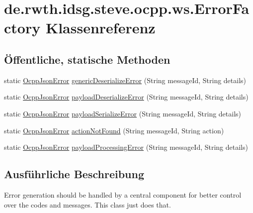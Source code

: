 \hypertarget{classde_1_1rwth_1_1idsg_1_1steve_1_1ocpp_1_1ws_1_1_error_factory}{\section{de.\-rwth.\-idsg.\-steve.\-ocpp.\-ws.\-Error\-Factory Klassenreferenz}
\label{classde_1_1rwth_1_1idsg_1_1steve_1_1ocpp_1_1ws_1_1_error_factory}
}
\subsection*{Öffentliche, statische Methoden}
\begin{DoxyCompactItemize}
\item 
static \hyperlink{classde_1_1rwth_1_1idsg_1_1steve_1_1ocpp_1_1ws_1_1data_1_1_ocpp_json_error}{Ocpp\-Json\-Error} \hyperlink{classde_1_1rwth_1_1idsg_1_1steve_1_1ocpp_1_1ws_1_1_error_factory_a2db20dbc0ac39ded7843ff0167402f43}{generic\-Deserialize\-Error} (String message\-Id, String details)
\item 
static \hyperlink{classde_1_1rwth_1_1idsg_1_1steve_1_1ocpp_1_1ws_1_1data_1_1_ocpp_json_error}{Ocpp\-Json\-Error} \hyperlink{classde_1_1rwth_1_1idsg_1_1steve_1_1ocpp_1_1ws_1_1_error_factory_aea04a7226503210ba5672606c47532d0}{payload\-Deserialize\-Error} (String message\-Id, String details)
\item 
static \hyperlink{classde_1_1rwth_1_1idsg_1_1steve_1_1ocpp_1_1ws_1_1data_1_1_ocpp_json_error}{Ocpp\-Json\-Error} \hyperlink{classde_1_1rwth_1_1idsg_1_1steve_1_1ocpp_1_1ws_1_1_error_factory_ad51500921339048842705b1a1a9acd39}{payload\-Serialize\-Error} (String message\-Id, String details)
\item 
static \hyperlink{classde_1_1rwth_1_1idsg_1_1steve_1_1ocpp_1_1ws_1_1data_1_1_ocpp_json_error}{Ocpp\-Json\-Error} \hyperlink{classde_1_1rwth_1_1idsg_1_1steve_1_1ocpp_1_1ws_1_1_error_factory_aea3a0c5d1cded6a34744d66f8800616f}{action\-Not\-Found} (String message\-Id, String action)
\item 
static \hyperlink{classde_1_1rwth_1_1idsg_1_1steve_1_1ocpp_1_1ws_1_1data_1_1_ocpp_json_error}{Ocpp\-Json\-Error} \hyperlink{classde_1_1rwth_1_1idsg_1_1steve_1_1ocpp_1_1ws_1_1_error_factory_aa9a4554e30593e6825c4a301e5f2badc}{payload\-Processing\-Error} (String message\-Id, String details)
\end{DoxyCompactItemize}


\subsection{Ausführliche Beschreibung}
Error generation should be handled by a central component for better control over the codes and messages. This class just does that.


